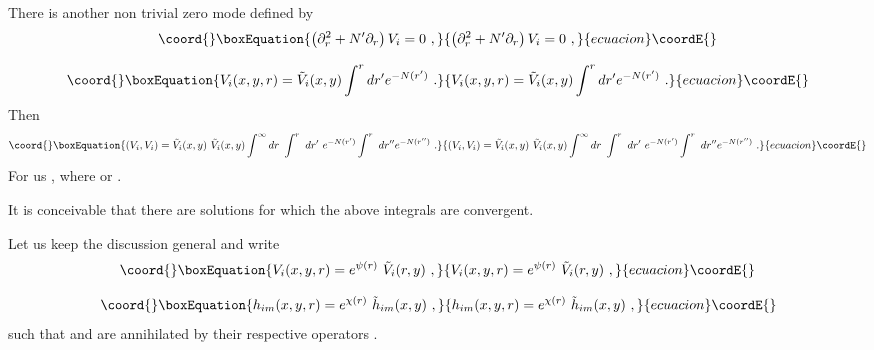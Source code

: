 \documentclass[a4paper,12pt]{article}
\begin{document}
\begin{appendix}
There is another non trivial  zero mode defined by
\begin{equation}\coord{}\boxEquation{
\left(\partial^2_r + N'\partial_r\right) V_i = 0~,
}{
\left(\partial^2_r + N'\partial_r\right) V_i = 0~,
}{ecuacion}\coordE{}\end{equation}

\begin{equation}\coord{}\boxEquation{
V_i(x,y,r) = \tilde V_i(x,y)\int^rdr' e^{-N(r')}~.
}{
V_i(x,y,r) = \tilde V_i(x,y)\int^rdr' e^{-N(r')}~.
}{ecuacion}\coordE{}\end{equation}
Then
\begin{equation}\coord{}\boxEquation{
(V_i,V_i) =\tilde V_i(x,y)\ \tilde V_i(x,y)
\int^\infty dr\ \int^r\ dr'\ e^{-N(r')}
\int^r\ dr'' e^{-N(r'')}~.
}{
(V_i,V_i) =\tilde V_i(x,y)\ \tilde V_i(x,y)
\int^\infty dr\ \int^r\ dr'\ e^{-N(r')}
\int^r\ dr'' e^{-N(r'')}~.
}{ecuacion}\coordE{}\end{equation}
For us \coordHE{}, where \coordHE{} or \coordHE{}.

It is conceivable that there are solutions for which the above
integrals are convergent.

Let us keep the discussion general and write
\begin{equation}\coord{}\boxEquation{
V_i (x,y,r) = e^{\psi(r)}\ \tilde V_i(r,y)~,
}{
V_i (x,y,r) = e^{\psi(r)}\ \tilde V_i(r,y)~,
}{ecuacion}\coordE{}\end{equation}

\begin{equation}\coord{}\boxEquation{
h_{im} (x,y,r) = e^{\chi(r)}\ \tilde h _{im} (x,y)~,
}{
h_{im} (x,y,r) = e^{\chi(r)}\ \tilde h _{im} (x,y)~,
}{ecuacion}\coordE{}\end{equation}
such that  \coordHE{} and \coordHE{} are annihilated by their respective
operators \coordHE{}.


\end{appendix}
\end{document}

